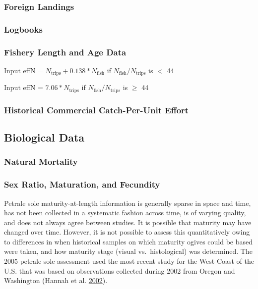 \documentclass[12pt,]{article}
\begin{document}
\subsubsection{Foreign Landings}\label{foreign-landings}

\subsubsection{Logbooks}\label{logbooks}

\subsubsection{Fishery Length and Age
Data}\label{fishery-length-and-age-data}

\begin{centering}

Input effN = $N_{\text{trips}} + 0.138 * N_{\text{fish}}$ if $N_{\text{fish}}/N_{\text{trips}}$ is $<$ 44

Input effN = $7.06 * N_{\text{trips}}$ if $N_{\text{fish}}/N_{\text{trips}}$ is $\geq$ 44

\end{centering}

\subsubsection{Historical Commercial Catch-Per-Unit
Effort}\label{historical-commercial-catch-per-unit-effort}

\subsection{Biological Data}\label{biological-data}

\subsubsection{Natural Mortality}\label{natural-mortality}

\subsubsection{Sex Ratio, Maturation, and
Fecundity}\label{sex-ratio-maturation-and-fecundity}

Petrale sole maturity-at-length information is generally sparse in space
and time, has not been collected in a systematic fashion across time, is
of varying quality, and does not always agree between studies. It is
possible that maturity may have changed over time. However, it is not
possible to assess this quantitatively owing to differences in when
historical samples on which maturity ogives could be based were taken,
and how maturity stage (visual vs.~histological) was determined. The
2005 petrale sole assessment used the most recent study for the West
Coast of the U.S. that was based on observations collected during 2002
from Oregon and Washington (Hannah et al.
\protect\hyperlink{ref-hannah_length_2002}{2002}).
\end{document}
